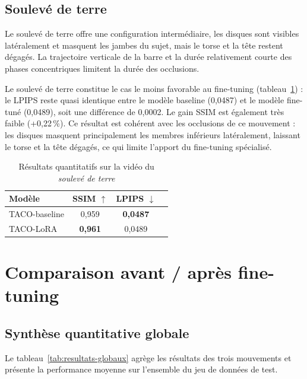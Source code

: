 \subsection{Soulevé de terre} \label{sec:resultats-deadlift}

Le soulevé de terre offre une configuration intermédiaire, les disques sont visibles latéralement et masquent les jambes du sujet, mais le torse et la tête restent dégagés. La trajectoire verticale de la barre et la durée relativement courte des phases concentriques limitent la durée des occlusions.

Le soulevé de terre constitue le cas le moins favorable au fine-tuning (tableau~\ref{tab:resultats-deadlift}) : le LPIPS reste quasi identique entre le modèle baseline (0,0487) et le modèle fine-tuné (0,0489), soit une différence de 0,0002. Le gain SSIM est également très faible (+0,22\,\%). Ce résultat est cohérent avec les occlusions de ce mouvement : les disques masquent principalement les membres inférieurs latéralement, laissant le torse et la tête dégagés, ce qui limite l'apport du fine-tuning spécialisé.

\begin{table}[h]
  \centering
  \begin{tabular}{lccc}
    \hline
    \textbf{Modèle} & \textbf{SSIM} $\uparrow$ & \textbf{LPIPS} $\downarrow$ \\
    \hline
    TACO-baseline          & 0,959 & \textbf{0,0487} \\
    TACO-LoRA & \textbf{0,961} & 0,0489 \\
    \hline
  \end{tabular}
  \caption{Résultats quantitatifs sur la vidéo du \emph{soulevé de terre}}
  \label{tab:resultats-deadlift}
\end{table}

\section{Comparaison avant / après fine-tuning}

\subsection{Synthèse quantitative globale}

Le tableau~\ref{tab:resultats-globaux} agrège les résultats des trois mouvements et présente la performance moyenne sur l'ensemble du jeu de données de test.

